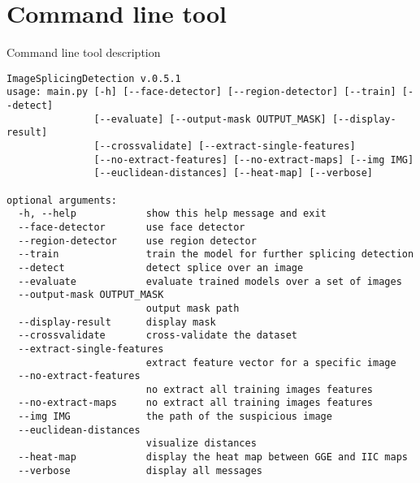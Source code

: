 \chapter{Command line tool}

Command line tool description

\begin{verbatim}
ImageSplicingDetection v.0.5.1
usage: main.py [-h] [--face-detector] [--region-detector] [--train] [--detect]
               [--evaluate] [--output-mask OUTPUT_MASK] [--display-result]
               [--crossvalidate] [--extract-single-features]
               [--no-extract-features] [--no-extract-maps] [--img IMG]
               [--euclidean-distances] [--heat-map] [--verbose]

optional arguments:
  -h, --help            show this help message and exit
  --face-detector       use face detector
  --region-detector     use region detector
  --train               train the model for further splicing detection
  --detect              detect splice over an image
  --evaluate            evaluate trained models over a set of images
  --output-mask OUTPUT_MASK
                        output mask path
  --display-result      display mask
  --crossvalidate       cross-validate the dataset
  --extract-single-features
                        extract feature vector for a specific image
  --no-extract-features
                        no extract all training images features
  --no-extract-maps     no extract all training images features
  --img IMG             the path of the suspicious image
  --euclidean-distances
                        visualize distances
  --heat-map            display the heat map between GGE and IIC maps
  --verbose             display all messages

\end{verbatim}